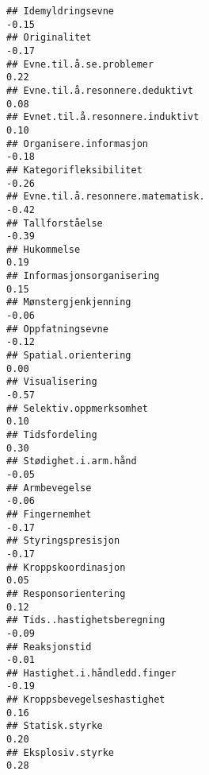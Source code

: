 \documentclass[
]{article}
\begin{document}
\begin{verbatim}
## Idemyldringsevne                                                                 -0.15
## Originalitet                                                                     -0.17
## Evne.til.å.se.problemer                                                           0.22
## Evne.til.å.resonnere.deduktivt                                                    0.08
## Evnet.til.å.resonnere.induktivt                                                   0.10
## Organisere.informasjon                                                           -0.18
## Kategorifleksibilitet                                                            -0.26
## Evne.til.å.resonnere.matematisk.                                                 -0.42
## Tallforståelse                                                                   -0.39
## Hukommelse                                                                        0.19
## Informasjonsorganisering                                                          0.15
## Mønstergjenkjenning                                                              -0.06
## Oppfatningsevne                                                                  -0.12
## Spatial.orientering                                                               0.00
## Visualisering                                                                    -0.57
## Selektiv.oppmerksomhet                                                            0.10
## Tidsfordeling                                                                     0.30
## Stødighet.i.arm.hånd                                                             -0.05
## Armbevegelse                                                                     -0.06
## Fingernemhet                                                                     -0.17
## Styringspresisjon                                                                -0.17
## Kroppskoordinasjon                                                                0.05
## Responsorientering                                                                0.12
## Tids..hastighetsberegning                                                        -0.09
## Reaksjonstid                                                                     -0.01
## Hastighet.i.håndledd.finger                                                      -0.19
## Kroppsbevegelseshastighet                                                         0.16
## Statisk.styrke                                                                    0.20
## Eksplosiv.styrke                                                                  0.28

\end{verbatim}
\end{document}
